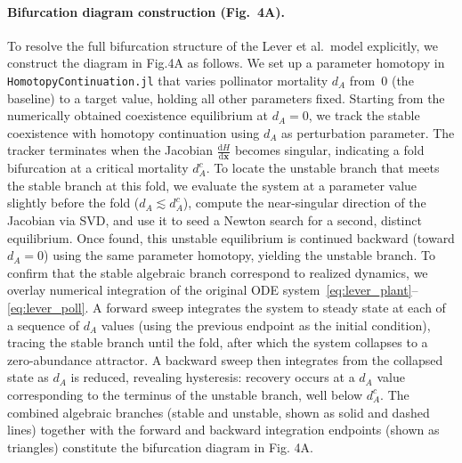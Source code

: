 \documentclass[pdflatex,sn-mathphys-num]{sn-jnl}%
\begin{document}
\paragraph{Bifurcation diagram construction (Fig.~4A).}
To resolve the full bifurcation structure of the Lever et al.\ model explicitly, we construct the diagram in Fig.4A as follows. We set up a parameter homotopy in \texttt{HomotopyContinuation.jl} that varies pollinator mortality $d_A$ from~$0$ (the baseline) to a target value, holding all other parameters fixed. Starting from the numerically obtained coexistence equilibrium at $d_A = 0$, we track the stable coexistence with homotopy continuation using $d_A$ as perturbation parameter. The tracker terminates when the Jacobian $\frac{\mathrm{d}H}{\mathrm{d}\mathbf{x}}$ becomes singular, indicating a fold bifurcation at a critical mortality $d_A^c$. To locate the unstable branch that meets the stable branch at this fold, we evaluate the system at a parameter value slightly before the fold ($d_A \lesssim d_A^c$), compute the near-singular direction of the Jacobian via SVD, and use it to seed a Newton search for a second, distinct equilibrium. Once found, this unstable equilibrium is continued backward (toward $d_A = 0$) using the same parameter homotopy, yielding the unstable branch. To confirm that the stable algebraic branch correspond to realized dynamics, we overlay numerical integration of the original ODE system~\eqref{eq:lever_plant}--\eqref{eq:lever_poll}. A forward sweep integrates the system to steady state at each of a sequence of $d_A$ values (using the previous endpoint as the initial condition), tracing the stable branch until the fold, after which the system collapses to a zero-abundance attractor. A backward sweep then integrates from the collapsed state as $d_A$ is reduced, revealing hysteresis: recovery occurs at a $d_A$ value corresponding to the terminus of the unstable branch, well below $d_A^c$. The combined algebraic branches (stable and unstable, shown as solid and dashed lines) together with the forward and backward integration endpoints (shown as triangles) constitute the bifurcation diagram in Fig. 4A. 
\end{document}
